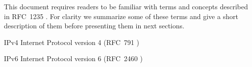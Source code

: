 This document requires readers to be familiar with terms and concepts described in \mbox{RFC~1235} \cite{john_ioannidis_coherent_1991}. For clarity we summarize some of these terms and give a short description of them before presenting them in next sections.

\begin{basedescript}{\desclabelstyle{\pushlabel}\desclabelwidth{10em}}
\item[IPv4]					Internet Protocol version 4 (RFC~791 \cite{postel_internet_1981})
\item[IPv6]					Internet Protocol version 6 (RFC~2460 \cite{deering_internet_1998})
\end{basedescript}